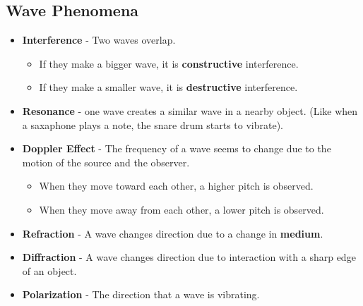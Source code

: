 \documentclass[letterpaper, 12pt]{article}
\begin{document}
\subsection*{Wave Phenomena}
	\begin{itemize}
		\item \textbf{Interference} - Two waves overlap.
		\begin{itemize}
			\item If they make a bigger wave, it is \textbf{constructive} interference. 
			\item If they make a smaller wave, it is \textbf{destructive} interference. 
		\end{itemize}

		\item \textbf{Resonance} - one wave creates a similar wave in a nearby object. (Like when a saxaphone plays a note, the snare drum starts to vibrate).
		\item \textbf{Doppler Effect} - The frequency of a wave seems to change due to the motion of the source and the observer. 
			\begin{itemize}
				\item When they move toward each other, a higher pitch is observed.
				\item When they move away from each other, a lower pitch is observed.
			\end{itemize}
		\item \textbf{Refraction} - A wave changes direction due to a change in \textbf{medium}.
		\item \textbf{Diffraction} - A wave changes direction due to interaction with a sharp edge of an object. 
		\item \textbf{Polarization} - The direction that a wave is vibrating. 
	\end{itemize}
	

 
\end{document}
